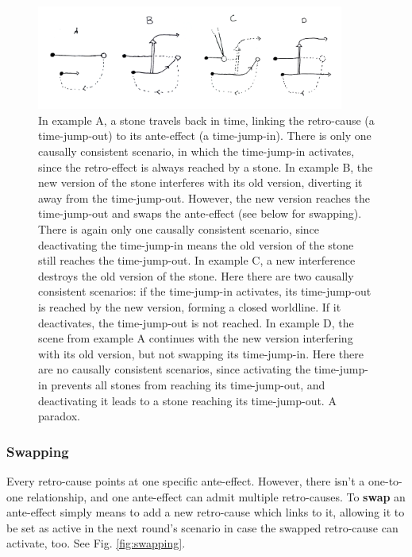 \documentclass[12pt]{article}
\begin{document}
	\begin{figure}[h]
\begin{center}
    \includegraphics[width=0.9\textwidth]{images/diag_canonisation}
 \caption{In example A, a stone travels back in time, linking the retro-cause (a time-jump-out) to its ante-effect (a time-jump-in). There is only one causally consistent scenario, in which the time-jump-in activates, since the retro-effect is always reached by a stone. In example B, the new version of the stone interferes with its old version, diverting it away from the time-jump-out. However, the new version reaches the time-jump-out and swaps the ante-effect (see below for swapping). There is again only one causally consistent scenario, since deactivating the time-jump-in means the old version of the stone still reaches the time-jump-out. In example C, a new interference destroys the old version of the stone. Here there are two causally consistent scenarios: if the time-jump-in activates, its time-jump-out is reached by the new version, forming a closed worldline. If it deactivates, the time-jump-out is not reached. In example D, the scene from example A continues with the new version interfering with its old version, but not swapping its time-jump-in. Here there are no causally consistent scenarios, since activating the time-jump-in prevents all stones from reaching its time-jump-out, and deactivating it leads to a stone reaching its time-jump-out. A paradox.}\label{fig:canonisation}
\end{center}
\end{figure}
	\subsubsection{Swapping}\label{sec:swapping}
	Every retro-cause points at one specific ante-effect. However, there isn't a one-to-one relationship, and one ante-effect can admit multiple retro-causes. To \textbf{swap} an ante-effect simply means to add a new retro-cause which links to it, allowing it to be set as active in the next round's scenario in case the swapped retro-cause can activate, too. See Fig. \ref{fig:swapping}.
	
\end{document}
